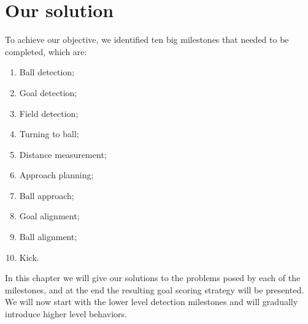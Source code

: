 \chapter{Our solution}

To achieve our objective, we identified ten big milestones that needed to be
completed, which are:

\begin{enumerate}

  \item Ball detection;

  \item Goal detection;

  \item Field detection;

  \item Turning to ball;

  \item Distance measurement;

  \item Approach planning;

  \item Ball approach;

  \item Goal alignment;

  \item Ball alignment;

  \item Kick.

\end{enumerate}

In this chapter we will give our solutions to the problems posed by each of the
milestones, and at the end the resulting goal scoring strategy will be
presented. We will now start with the lower level detection milestones and
will gradually introduce higher level behaviors.
